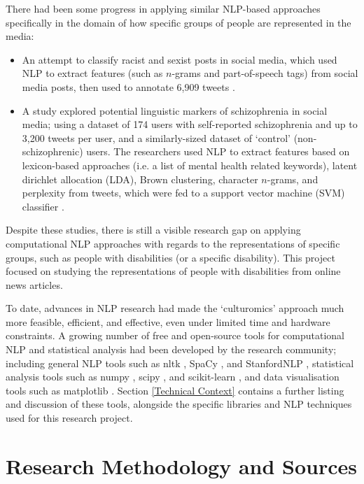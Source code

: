 \documentclass{report}
\begin{document}
There had been some progress in applying similar NLP-based approaches specifically in the domain of how specific groups of people are represented in the media:
\begin{itemize}
	\item An attempt to classify racist and sexist posts in social media, which used NLP to extract features (such as $n$-grams and part-of-speech tags) from social media posts, then used to annotate 6,909 tweets \cite{waseem2016you}.
	\item A study explored potential linguistic markers of schizophrenia in social media; using a dataset of 174 users with self-reported schizophrenia and up to 3,200 tweets per user, and a similarly-sized dataset of `control' (non-schizophrenic) users.
		The researchers used NLP to extract features based on lexicon-based approaches (i.e. a list of mental health related keywords), latent dirichlet allocation (LDA), Brown clustering, character $n$-grams, and perplexity from tweets, which were fed to a support vector machine (SVM) classifier \cite{mitchell2015quantifying}.
\end{itemize}
Despite these studies, there is still a visible research gap on applying computational NLP approaches with regards to the representations of specific groups, such as people with disabilities (or a specific disability).
This project focused on studying the representations of people with disabilities from online news articles.

To date, advances in NLP research had made the `culturomics' approach much more feasible, efficient, and effective, even under limited time and hardware constraints.
A growing number of free and open-source tools for computational NLP and statistical analysis had been developed by the research community; including general NLP tools such as nltk \cite{Nltk}, SpaCy \cite{SpaCy}, and StanfordNLP \cite{StanfordNLP}, statistical analysis tools such as numpy \cite{Numpy}, scipy \cite{Scipy}, and scikit-learn \cite{Scikit-learn}, and data visualisation tools such as matplotlib \cite{Matplotlib}.
Section \ref{Technical Context} contains a further listing and discussion of these tools, alongside the specific libraries and NLP techniques used for this research project.

\section{Research Methodology and Sources} \label{Research Methodology and Sources}  %
\end{document}
